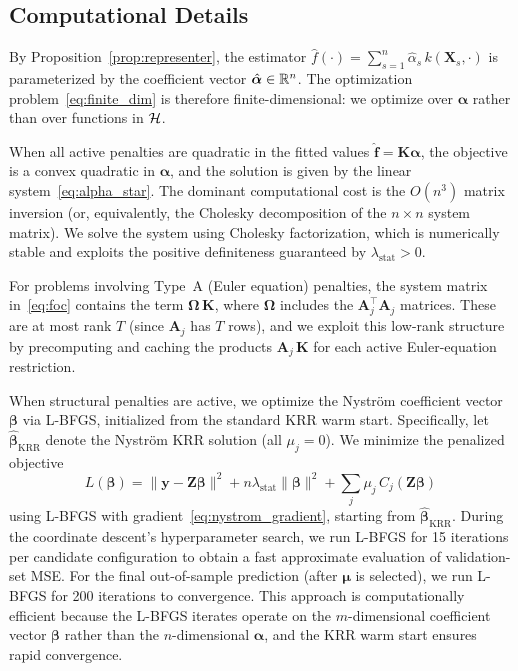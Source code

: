 \subsection{Computational Details}\label{sub:computation}

By Proposition~\ref{prop:representer}, the estimator $\hat{f}(\cdot) = \sum_{s=1}^n \hat{\alpha}_s\, k(\mathbf{X}_s, \cdot)$ is parameterized by the coefficient vector $\hat{\bm{\alpha}} \in \mathbb{R}^n$.
The optimization problem~\eqref{eq:finite_dim} is therefore finite-dimensional: we optimize over $\bm{\alpha}$ rather than over functions in $\mathcal{H}$.

When all active penalties are quadratic in the fitted values $\hat{\mathbf{f}} = \mathbf{K}\bm{\alpha}$, the objective is a convex quadratic in $\bm{\alpha}$, and the solution is given by the linear system~\eqref{eq:alpha_star}.
The dominant computational cost is the $O(n^3)$ matrix inversion (or, equivalently, the Cholesky decomposition of the $n \times n$ system matrix).
We solve the system using Cholesky factorization, which is numerically stable and exploits the positive definiteness guaranteed by $\lambda_{\mathrm{stat}} > 0$.

For problems involving Type~A (Euler equation) penalties, the system matrix in~\eqref{eq:foc} contains the term $\bm{\Omega}\,\mathbf{K}$, where $\bm{\Omega}$ includes the $\mathbf{A}_j^\top \mathbf{A}_j$ matrices.
These are at most rank $T$ (since $\mathbf{A}_j$ has $T$ rows), and we exploit this low-rank structure by precomputing and caching the products $\mathbf{A}_j\,\mathbf{K}$ for each active Euler-equation restriction.

When structural penalties are active, we optimize the Nystr\"{o}m coefficient vector $\boldsymbol{\beta}$ via L-BFGS, initialized from the standard KRR warm start.
Specifically, let $\hat{\boldsymbol{\beta}}_{\mathrm{KRR}}$ denote the Nystr\"{o}m KRR solution (all $\mu_j = 0$).
We minimize the penalized objective
\begin{equation}\label{eq:lbfgs_obj}
L(\boldsymbol{\beta}) = \|\mathbf{y} - \mathbf{Z}\boldsymbol{\beta}\|^2 + n\lambda_{\mathrm{stat}}\|\boldsymbol{\beta}\|^2 + \sum_j \mu_j\, C_j(\mathbf{Z}\boldsymbol{\beta})
\end{equation}
using L-BFGS with gradient~\eqref{eq:nystrom_gradient}, starting from $\hat{\boldsymbol{\beta}}_{\mathrm{KRR}}$.
During the coordinate descent's hyperparameter search, we run L-BFGS for 15 iterations per candidate configuration to obtain a fast approximate evaluation of validation-set MSE.
For the final out-of-sample prediction (after $\bm{\mu}$ is selected), we run L-BFGS for 200 iterations to convergence.
This approach is computationally efficient because the L-BFGS iterates operate on the $m$-dimensional coefficient vector $\boldsymbol{\beta}$ rather than the $n$-dimensional $\boldsymbol{\alpha}$, and the KRR warm start ensures rapid convergence.

